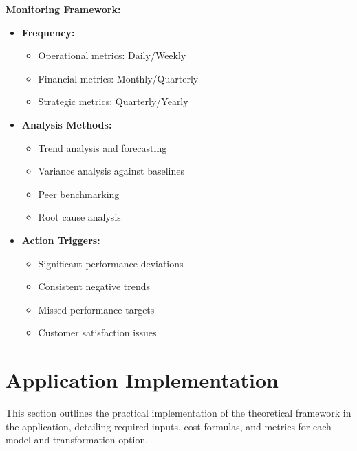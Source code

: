 \documentclass[12pt,a4paper]{article}
\newenvironment{explanation}
{\begin{mdframed}[style=explanationstyle,frametitle={Explanation}]}
{\end{mdframed}}
\begin{document}
\begin{explanation}
\textbf{Monitoring Framework:}
\begin{itemize}
    \item \textbf{Frequency:}
        \begin{itemize}
            \item Operational metrics: Daily/Weekly
            \item Financial metrics: Monthly/Quarterly
            \item Strategic metrics: Quarterly/Yearly
        \end{itemize}
    \item \textbf{Analysis Methods:}
        \begin{itemize}
            \item Trend analysis and forecasting
            \item Variance analysis against baselines
            \item Peer benchmarking
            \item Root cause analysis
        \end{itemize}
    \item \textbf{Action Triggers:}
        \begin{itemize}
            \item Significant performance deviations
            \item Consistent negative trends
            \item Missed performance targets
            \item Customer satisfaction issues
        \end{itemize}
\end{itemize}
\end{explanation}

\section{Application Implementation}
This section outlines the practical implementation of the theoretical framework in the application, detailing required inputs, cost formulas, and metrics for each model and transformation option.
\end{document}

